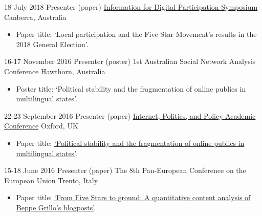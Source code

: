 \documentclass[11pt,a4paper,sans]{moderncv}
\begin{document}
    \cventry
        {18 July 2018} %
    {Presenter (paper)} %
    {\href{https://www.canberra.edu.au/research/faculty-research-centres/nmrc/news-and-events/events/digital-participation}{Information for Digital Participation Symposium}} %
    {Canberra, Australia} %
{}
    {
      \begin{itemize} %
        \item {Paper title: `Local participation and the Five Star Movement’s results in the 2018 General Election'.}
      \end{itemize}
    }


    \cventry
      {16-17 November 2016} %
    {Presenter (poster)} %
    {1st Australian Social Network Analysis Conference} %
    {Hawthorn, Australia} %
  {}
    {
      \begin{itemize} %
        \item {Poster title: `Political stability and the fragmentation of online publics in multilingual states'.}
      \end{itemize}
    }

    \cventry
        {22-23 September 2016} %
    {Presenter (paper)} %
    {\href{http://ipp.oii.ox.ac.uk/2016}{Internet, Politics, and Policy Academic Conference}} %
    {Oxford, UK} %
{}
    {
      \begin{itemize} %
        \item {Paper title: \href{http://ipp.oii.ox.ac.uk/2016/programme-2016/track-a-politics/participation-ii-networks-and/francesco-bailo-political-stability-and}{`Political stability and the fragmentation of online publics in multilingual states'}.}
      \end{itemize}
    }


    \cventry
        {15-18 June 2016} %
    {Presenter (paper)} %
    {The 8th Pan-European Conference on the European Union} %
    {Trento, Italy} %
{}
    {
      \begin{itemize} %
        \item {Paper title:  \href{http://ecpr.eu/Events/PaperDetails.aspx?PaperID=27234&amp;EventID=105}{`From Five Stars to ground: A quantitative content analysis of Beppe Grillo's blogposts'}.}
      \end{itemize}
    }
\end{document}
